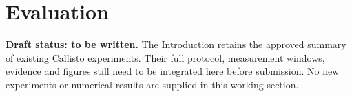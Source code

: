 \section{Evaluation}
\label{sec:evaluation}
\noindent\textbf{Draft status: to be written.}
The Introduction retains the approved summary of existing Callisto
experiments. Their full protocol, measurement windows, evidence and
figures still need to be integrated here before submission. No new
experiments or numerical results are supplied in this working section.
